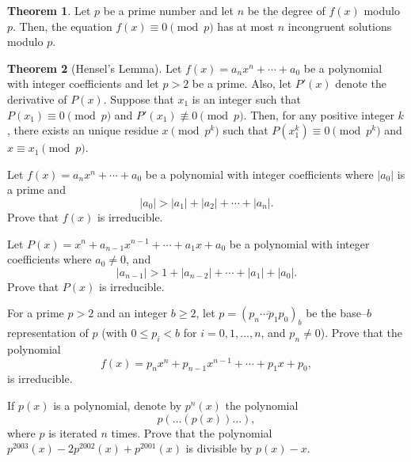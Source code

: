 \documentclass[12pt,a4paper]{memoir}
\theoremstyle{definition}
\newtheorem{theorem}{Theorem}
\begin{document}
\begin{theorem}
	Let $p$ be a prime number and let $n$ be the degree of $f(x)$ modulo $p$. Then, the equation $f(x) \equiv 0 \pmod p$ has at most $n$ incongruent solutions modulo $p$.
\end{theorem}

\begin{theorem}[Hensel's Lemma]
	Let $f(x)=a_nx^n+\cdots+a_0$ be a polynomial with integer coefficients and let $p> 2$
	be a prime. Also, let $P'(x)$ denote the derivative of $P(x)$. Suppose that $x_1$ is an integer such that $P(x_1)\equiv 0 \pmod{p}$ and $P'(x_1)\not \equiv 0 \pmod{p}$. Then, for any positive integer $k$, there exists an unique residue $x \pmod{p^k}$ such that $P(x_1^k)\equiv 0 \pmod{p^k}$ and $x  \equiv x_1 \pmod{p}$.
\end{theorem}

\begin{question}
	Let $f(x)=a_nx^n+\cdots+a_0$ be a polynomial with integer coefficients where $|a_0|$ is a prime and
	\[|a_0| > |a_1| + |a_2| + \cdots + |a_n|.\]
	Prove that $f(x)$ is irreducible.
\end{question}




\begin{question}[name={Perron's Criterion}]
	Let $P(x)=x^n+a_{n-1}x^{n-1}+\cdots+a_1x+a_0$ be a polynomial with integer coefficients where $a_0 \neq 0$, and
	\[|a_{n-1}| > 1 + |a_{n-2}| +  \cdots + |a_1| + |a_0|.\]
	Prove that $P(x)$ is irreducible.
\end{question}



\begin{question}[name={Cohn's Criterion}]
	For a prime $p>2$ and an integer $b \geq 2$, let $p=(\overline{p_n\cdots p_1p_0})_b$ be the base--$b$ representation of $p$ (with $0 \leq p_i < b$ for $i=0,1,\dots,n$, and $p_n\neq 0$). Prove that the polynomial
	\[f(x)=p_nx^n+p_{n-1}x^{n-1}+\cdots+p_1x+p_0,\]
	is irreducible.
\end{question}


\begin{question}[name={2003 Serbia TST}]
	If $p(x)$ is a polynomial, denote by $p^n(x)$ the polynomial \[p(\dots(p(x))\dots),\] where $p$ is iterated $n$ times. Prove that the polynomial $p^{2003}(x)-2p^{2002}(x)+p^{2001}(x)$ is divisible by $ p(x)-x$.
\end{question}
\end{document}

